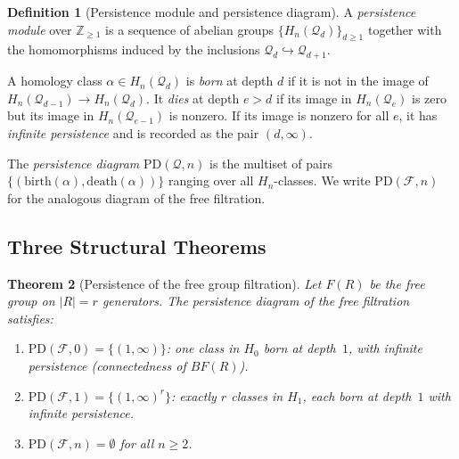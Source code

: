 \documentclass{article}
\newtheorem{theorem}{Theorem}[section]
\theoremstyle{definition}
\newtheorem{definition}[theorem]{Definition}
\theoremstyle{remark}
\begin{document}
\begin{definition}[Persistence module and persistence diagram]
\label{def:persistence}
A \emph{persistence module} over $\mathbb{Z}_{\geq 1}$ is a
sequence of abelian groups $\{H_n(\mathcal{Q}_d)\}_{d \geq 1}$
together with the homomorphisms induced by the inclusions
$\mathcal{Q}_d \hookrightarrow \mathcal{Q}_{d+1}$.

A homology class $\alpha \in H_n(\mathcal{Q}_d)$ is \emph{born}
at depth $d$ if it is not in the image of
$H_n(\mathcal{Q}_{d-1}) \to H_n(\mathcal{Q}_d)$. It \emph{dies}
at depth $e > d$ if its image in $H_n(\mathcal{Q}_e)$ is zero
but its image in $H_n(\mathcal{Q}_{e-1})$ is nonzero. If its
image is nonzero for all $e$, it has \emph{infinite persistence}
and is recorded as the pair $(d, \infty)$.

The \emph{persistence diagram} $\mathrm{PD}(\mathcal{Q}, n)$ is
the multiset of pairs $\{(\mathrm{birth}(\alpha), \mathrm{death}(\alpha))\}$
ranging over all $H_n$-classes. We write
$\mathrm{PD}(\mathcal{F}, n)$ for the analogous diagram of the
free filtration.
\end{definition}

\subsection{Three Structural Theorems}

\begin{theorem}[Persistence of the free group filtration]
\label{thm:free_persistence}
Let $F(R)$ be the free group on $|R| = r$ generators. The
persistence diagram of the free filtration satisfies:
\begin{enumerate}[label=(\roman*)]
  \item $\mathrm{PD}(\mathcal{F}, 0) = \{(1, \infty)\}$:
        one class in $H_0$ born at depth~$1$, with infinite
        persistence (connectedness of $BF(R)$).
  \item $\mathrm{PD}(\mathcal{F}, 1) = \{(1,\infty)^r\}$:
        exactly $r$ classes in $H_1$, each born at depth~$1$
        with infinite persistence.
  \item $\mathrm{PD}(\mathcal{F}, n) = \emptyset$ for all $n \geq 2$.
\end{enumerate}
\end{theorem}
\end{document}
